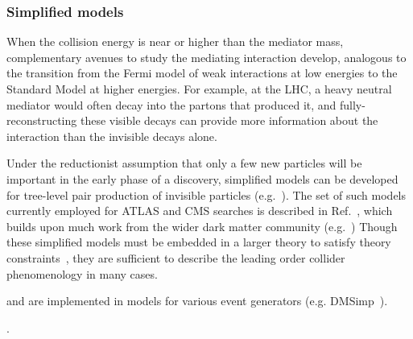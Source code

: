 \subsubsection{Simplified models}
\label{sub:simplifiedModels}

When the collision energy is near or higher than the mediator mass, complementary avenues to study the mediating interaction develop, analogous to the transition from the Fermi model of weak interactions at low energies to the Standard Model at higher energies.
For example, at the LHC, a heavy neutral \Zprime mediator would often decay into the partons that produced it, and fully-reconstructing these visible decays can provide more information about the interaction than the invisible decays alone. 

Under the reductionist assumption that only a few new particles will be important in the early phase of a discovery, simplified models can be developed for tree-level pair production of invisible particles (e.g.~\cite{Alwall:2008ag, Alves:2011wf}). 
The set of such models currently employed for ATLAS and CMS searches is described in Ref.~\cite{Abercrombie:2015wmb}, which builds upon much work from the wider dark matter community (e.g.~\cite{Fox:2011pm,Abdallah:2015ter}) 
Though these simplified models must be embedded in a larger theory to satisfy theory constraints~\cite{Kahlhoefer:2015bea}, they are sufficient to describe the leading order collider phenomenology in many cases.

\begin{marginnote}[]
 and are implemented in models for various event generators (e.g. DMSimp~\cite{NewMadgraphModels}). 
\end{marginnote}. 



